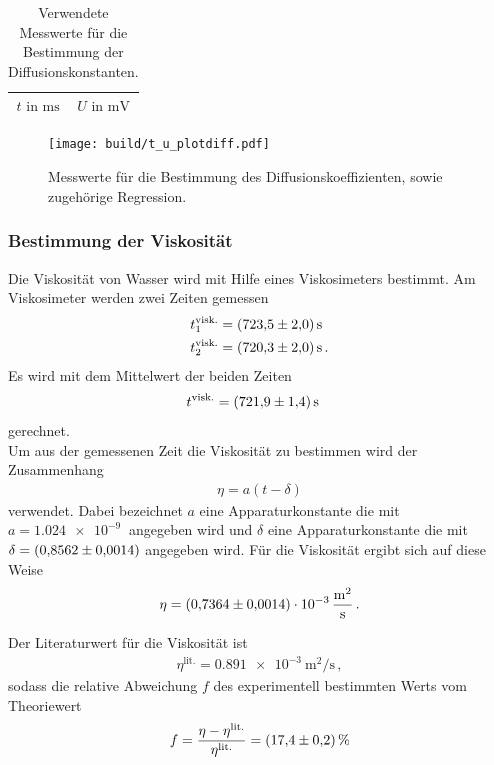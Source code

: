 \begin{table}
  \centering
  \caption{Verwendete Messwerte für die Bestimmung der Diffusionskonstanten.}
  \label{tab:diffusion}
  \begin{tabular}{c c}
  \toprule
  $t \text{ in } \si{\milli\second}$ & $U \text{ in } \si{\milli\volt}$\\
  \midrule
  
  \bottomrule
  \end{tabular}
\end{table}


\begin{figure}[hhh]
  \centering
  \texttt{[image: build/t\_u\_plotdiff.pdf]}
  \caption{Messwerte für die Bestimmung des Diffusionskoeffizienten, sowie zugehörige Regression.}
  \label{fig:diffusion}
\end{figure}

\FloatBarrier
\subsubsection{Bestimmung der Viskosität}
\label{subsubsec:viskositaet}
Die Viskosität von Wasser wird mit Hilfe eines Viskosimeters bestimmt.
Am Viskosimeter werden zwei Zeiten gemessen
\begin{align*}
  t_{1}^\text{visk.} &= \SI{723.5+-2}{\second}\\
  t_{2}^\text{visk.} &= \SI{720.3+-2}{\second}\, .
\end{align*}
Es wird mit dem Mittelwert der beiden Zeiten
\begin{align*}
  t^\text{visk.} &= \SI{721.9+-1.4}{\second}
\end{align*}
gerechnet.\\
Um aus der gemessenen Zeit die Viskosität zu bestimmen wird der Zusammenhang
\begin{align}
  \eta = a \left(t - \delta \right)
\end{align}
verwendet. Dabei bezeichnet $a$ eine Apparaturkonstante die mit $a = \SI{1.024e-9}{}$ angegeben wird und $\delta$
eine Apparaturkonstante die mit $\delta = \SI{0.8562+-0.0014}{}$ angegeben wird.
Für die Viskosität ergibt sich auf diese Weise
\begin{align*}
  \eta = \SI{0.7364+-0.0014 e-3}{\meter\squared\per\second} \, .
\end{align*}

Der Literaturwert\cite{litvisk} für die Viskosität ist
\begin{align*}
  \eta^\text{lit.} = \SI{0.891e-3}{\meter\squared\per\second} \, ,
\end{align*}
sodass die relative Abweichung $f$ des experimentell bestimmten Werts
vom Theoriewert
\begin{align*}
  f = \frac{\eta - \eta^\text{lit.}}{\eta^\text{lit.}} = \SI{17.4+-0.2}{\percent}
\end{align*}


